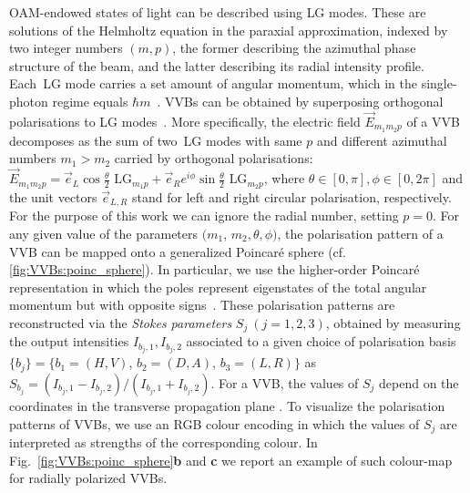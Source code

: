 \ac{OAM}-endowed states of light can be described using \ac{LG} modes.
These are solutions of the Helmholtz equation in the paraxial approximation, indexed by two integer numbers $(m, p)$, the former describing the azimuthal phase structure of the beam, and the latter describing its radial intensity profile.
Each~\ac{LG} mode carries a set amount of angular momentum, which in the single-photon regime equals $\hbar m$~\cite{allen1992orbital}.
\acp{VVB} can be obtained by superposing orthogonal polarisations to LG modes~\cite{padgett2004lights}.
More specifically, the electric field $\Vec{E}_{m_1m_2p}$ of a \ac{VVB} decomposes as the sum of two~\ac{LG} modes with same $p$ and different azimuthal numbers $m_1>m_2$ carried by orthogonal polarisations:
$\Vec{E}_{m_1m_2p}=\Vec{e}_L \cos{ \frac{\theta}{2}}\text{ LG$_{m_1p}$} +\Vec{e}_R e^{i \phi} \sin{ \frac{\theta}{2}}\text{ LG$_{m_2p}$}$,
where $\theta\in[0,\pi], \phi\in[0,2\pi]$ and the unit vectors $\Vec{e}_{L,R}$ stand for left and right circular polarisation, respectively.
For the purpose of this work we can ignore the radial number, setting $p=0$.
For any given value of the parameters $(m_1$, $m_2, \theta, \phi)$, the polarisation pattern of a \ac{VVB} can be mapped onto a generalized Poincar\'e sphere (cf. \cref{fig:VVBs:poinc_sphere}). In particular, we use the higher-order Poincar\'e representation in which the poles represent eigenstates of the total angular momentum but with opposite signs~\cite{milione2011higherorder}.
These polarisation patterns are reconstructed via the \emph{Stokes parameters} $S_{j}~(j=1,2,3)$, obtained by
measuring the output intensities $I_{b_j,1},I_{b_j,2}$ associated to a given choice of polarisation basis $\{b_j \}=\{b_1=( H,V )$, $b_2=( D,A )$, $b_3=( L,R )\}$ as $S_{b_j}=(I_{b_j,1}-I_{b_j,2})/(I_{b_j,1}+I_{b_j,2})$. %
For a VVB, the values of $S_j$ depend on the coordinates in the transverse propagation plane {\cite{cardano2012polarization}}.
To visualize the polarisation patterns of \acp{VVB}, we use an RGB colour encoding in which the values of $S_j$ are interpreted as strengths of the corresponding colour. In Fig.~\ref{fig:VVBs:poinc_sphere}{\bf b} and {\bf c} we report an example of such colour-map for radially polarized \acp{VVB}.

